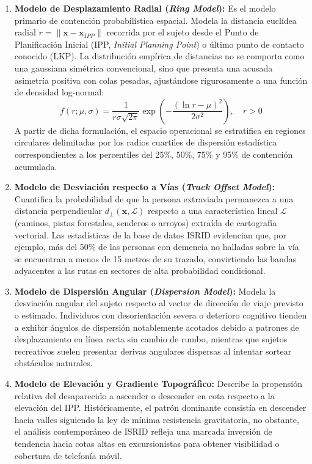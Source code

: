\begin{enumerate}
	\item \textbf{Modelo de Desplazamiento Radial (\textit{Ring Model}):} 
	Es el modelo primario de contención probabilística espacial. Modela la distancia euclídea radial $r = \|\mathbf{x} - \mathbf{x}_{IPP}\|$ recorrida por el sujeto desde el Punto de Planificación Inicial (IPP, \textit{Initial Planning Point}) o último punto de contacto conocido (LKP). La distribución empírica de distancias no se comporta como una gaussiana simétrica convencional, sino que presenta una acusada asimetría positiva con colas pesadas, ajustándose rigurosamente a una función de densidad log-normal:
	\begin{equation}
	f(r; \mu, \sigma) = \frac{1}{r \sigma \sqrt{2\pi}} \exp \left( -\frac{(\ln r - \mu)^2}{2\sigma^2} \right), \quad r > 0
	\end{equation}
	A partir de dicha formulación, el espacio operacional se estratifica en regiones circulares delimitadas por los radios cuartiles de dispersión estadística correspondientes a los percentiles del 25\%, 50\%, 75\% y 95\% de contención acumulada.
	
	\item \textbf{Modelo de Desviación respecto a Vías (\textit{Track Offset Model}):} 
	Cuantifica la probabilidad de que la persona extraviada permanezca a una distancia perpendicular $d_\perp(\mathbf{x}, \mathcal{L})$ respecto a una característica lineal $\mathcal{L}$ (caminos, pistas forestales, senderos o arroyos) extraída de cartografía vectorial. Las estadísticas de la base de datos ISRID evidencian que, por ejemplo, más del 50\% de las personas con demencia no halladas sobre la vía se encuentran a menos de 15 metros de su trazado, convirtiendo las bandas adyacentes a las rutas en sectores de alta probabilidad condicional.
	
	\item \textbf{Modelo de Dispersión Angular (\textit{Dispersion Model}):} 
	Modela la desviación angular del sujeto respecto al vector de dirección de viaje previsto o estimado. Individuos con desorientación severa o deterioro cognitivo tienden a exhibir ángulos de dispersión notablemente acotados debido a patrones de desplazamiento en línea recta sin cambio de rumbo, mientras que sujetos recreativos suelen presentar derivas angulares dispersas al intentar sortear obstáculos naturales.
	
	\item \textbf{Modelo de Elevación y Gradiente Topográfico:} 
	Describe la propensión relativa del desaparecido a ascender o descender en cota respecto a la elevación del IPP. Históricamente, el patrón dominante consistía en descender hacia valles siguiendo la ley de mínima resistencia gravitatoria, no obstante, el análisis contemporáneo de ISRID refleja una marcada inversión de tendencia hacia cotas altas en excursionistas para obtener visibilidad o cobertura de telefonía móvil.
	

\end{enumerate}
